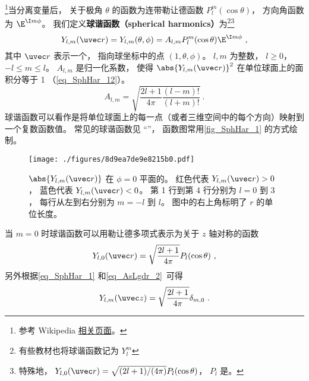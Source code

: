 

\footnote{参考 Wikipedia \href{https://en.wikipedia.org/wiki/Spherical_harmonics}{相关页面}。}当分离变量后， 关于极角 $\theta$ 的函数为连带勒让德函数 $P_l^m(\cos\theta)$， 方向角函数为 $\E^{\I m\phi}$。 我们定义\textbf{球谐函数（spherical harmonics）}为\footnote{有些教材也将球谐函数记为 $Y_l^m$}\footnote{特殊地， $Y_{l,0}(\uvec r) = \sqrt{(2l + 1)/(4\pi)}P_l(\cos\theta)$， $P_l$ 是。}
\begin{equation}\label{eq_SphHar_1}
Y_{l, m} (\uvec r) = Y_{l, m}(\theta, \phi) = A_{l,m} P_l^m(\cos \theta) \E^{\I m\phi}~,
\end{equation}
其中 $\uvec r$ 表示一个， 指向球坐标中的点 $(1, \theta, \phi)$。 $l, m$ 为整数， $l \geqslant 0$， $-l \leqslant m \leqslant l$。 $A_{l,m}$ 是归一化系数， 使得 $\abs{Y_{l, m} (\uvec r)}^2$ 在单位球面上的面积分等于 1 （\autoref{eq_SphHar_12}）。
\begin{equation}\label{eq_SphHar_2}
A_{l,m} =  \sqrt{\frac{2l + 1}{4\pi }\frac{(l - m)!}{(l + m)!}}~.
\end{equation}
球谐函数可以看作是将单位球面上的每一点（或者三维空间中的每个方向）映射到一个复数函数值。 常见的球谐函数见 “”， 函数图常用\autoref{fig_SphHar_1} 的方式绘制。

\begin{figure}[ht]
\centering
\texttt{[image: ./figures/8d9ea7de9e8215b0.pdf]}
\caption{$\abs{Y_{l,m}(\uvec r)}$ 在 $\phi=0$ 平面的。 红色代表 $Y_{l,m}(\uvec r) > 0$， 蓝色代表 $Y_{l,m}(\uvec r) < 0$。 第 1 行到第 4 行分别为 $l = 0$ 到 $3$， 每行从左到右分别为 $m = -l$ 到 $l$。 图中的右上角标明了 $r$ 的单位长度。} \label{fig_SphHar_1}
\end{figure}

当 $m = 0$ 时球谐函数可以用勒让德多项式表示为关于 $z$ 轴对称的函数
\begin{equation}\label{eq_SphHar_11}
Y_{l,0}(\uvec r) = \sqrt{\frac{2l+1}{4\pi}} P_l(\cos\theta)~,
\end{equation}
另外根据\autoref{eq_SphHar_1} 和\autoref{eq_AsLgdr_2}~可得
\begin{equation}
Y_{l,m}(\uvec z) = \sqrt{\frac{2l+1}{4\pi}} \delta_{m,0}~.
\end{equation}

